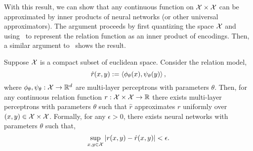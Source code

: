 With this result, we can show that any continuous function on ${\mathcal{X}} \times {\mathcal{X}}$ can be approximated by inner products of neural networks (or other universal approximators). The argument proceeds by first quantizing the space ${\mathcal{X}}$ and using~ to represent the relation function as an inner product of encodings. Then, a similar argument to~ shows the result.

\begin{theorem}\label{theoorem:asymemtric_inner_prod_rel_func_class}
    Suppose ${\mathcal{X}}$ is a compact subset of euclidean space. Consider the relation model,
    \begin{equation*}
        \hat{r}(x, y) := \left \langle \phi_\theta(x), \psi_\theta(y) \right\rangle,
    \end{equation*}
    \noindent where $\phi_\theta, \psi_\theta: {\mathcal{X}} \to \mathbb{R}^d$ are multi-layer perceptrons with parameters $\theta$. Then, for any continuous relation function $r: {\mathcal{X}} \times {\mathcal{X}} \to \mathbb{R}$ there exists multi-layer perceptrons with parameters $\theta$ such that $\hat{r}$ approximates $r$ uniformly over $(x,y) \in {\mathcal{X}} \times {\mathcal{X}}$. Formally, for any $\epsilon > 0$, there exists neural networks with parameters $\theta$ such that,
    \begin{equation*}
        \sup_{x, y \in {\mathcal{X}}} \left\lvert r(x,y) - \hat{r}(x,y)\right\rvert < \epsilon.
    \end{equation*}
\end{theorem}

